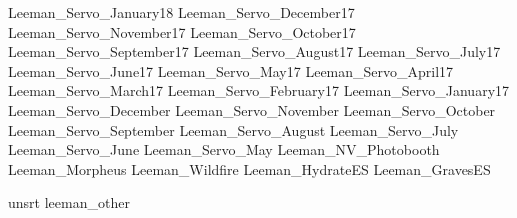 \documentclass[letterpaper]{article}
\begin{document}
\begingroup
\renewcommand{\section}[2]{}

\nocite{other}{Leeman_Servo_January18}
\nocite{other}{Leeman_Servo_December17}
\nocite{other}{Leeman_Servo_November17}
\nocite{other}{Leeman_Servo_October17}
\nocite{other}{Leeman_Servo_September17}
\nocite{other}{Leeman_Servo_August17}
\nocite{other}{Leeman_Servo_July17}
\nocite{other}{Leeman_Servo_June17}
\nocite{other}{Leeman_Servo_May17}
\nocite{other}{Leeman_Servo_April17}
\nocite{other}{Leeman_Servo_March17}
\nocite{other}{Leeman_Servo_February17}
\nocite{other}{Leeman_Servo_January17}
\nocite{other}{Leeman_Servo_December}
\nocite{other}{Leeman_Servo_November}
\nocite{other}{Leeman_Servo_October}
\nocite{other}{Leeman_Servo_September}
\nocite{other}{Leeman_Servo_August}
\nocite{other}{Leeman_Servo_July}
\nocite{other}{Leeman_Servo_June}
\nocite{other}{Leeman_Servo_May}
\nocite{other}{Leeman_NV_Photobooth}
\nocite{other}{Leeman_Morpheus}
\nocite{other}{Leeman_Wildfire}
\nocite{other}{Leeman_HydrateES}
\nocite{other}{Leeman_GravesES}

{unsrt}
{leeman_other}{}
\endgroup
\end{document}

